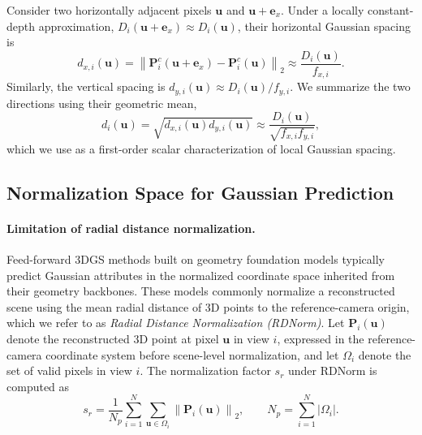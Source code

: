 Consider two horizontally adjacent pixels $\mathbf{u}$ and
$\mathbf{u}+\mathbf{e}_x$. Under a locally constant-depth approximation,
$D_i(\mathbf{u}+\mathbf{e}_x)\approx D_i(\mathbf{u})$, their horizontal
Gaussian spacing is
\begin{equation}
    d_{x,i}(\mathbf{u})
    =
    \left\|
        \mathbf{P}_i^{c}(\mathbf{u}+\mathbf{e}_x)
        -
        \mathbf{P}_i^{c}(\mathbf{u})
    \right\|_2
    \approx
    \frac{D_i(\mathbf{u})}{f_{x,i}}.
    \label{eq:horizontal_gaussian_spacing}
\end{equation}
Similarly, the vertical spacing is
$d_{y,i}(\mathbf{u})\approx D_i(\mathbf{u})/f_{y,i}$.
We summarize the two directions using their geometric mean,
\begin{equation}
    d_i(\mathbf{u})
    =
    \sqrt{
        d_{x,i}(\mathbf{u})d_{y,i}(\mathbf{u})
    }
    \approx
    \frac{D_i(\mathbf{u})}
    {\sqrt{f_{x,i}f_{y,i}}},
    \label{eq:gaussian_spacing}
\end{equation}
which we use as a first-order scalar characterization of local Gaussian
spacing.


\subsection{Normalization Space for Gaussian Prediction}
\label{sec:gsnorm}

\paragraph{Limitation of radial distance normalization.}

Feed-forward 3DGS methods built on geometry foundation models typically
predict Gaussian attributes in the normalized coordinate space inherited
from their geometry backbones. These models commonly normalize a reconstructed scene using the mean radial distance of 3D points to the reference-camera origin, which we
refer to as \emph{Radial Distance Normalization (RDNorm)}.
Let $\mathbf{P}_i(\mathbf{u})$ denote the reconstructed 3D point at
pixel $\mathbf{u}$ in view $i$, expressed in the reference-camera
coordinate system before scene-level normalization, and let $\Omega_i$
denote the set of valid pixels in view $i$.
The normalization factor $s_r$ under RDNorm is computed as
\begin{equation}
    s_r
    =
    \frac{1}{N_p}
    \sum_{i=1}^{N}
    \sum_{\mathbf{u}\in\Omega_i}
    \left\|
        \mathbf{P}_i(\mathbf{u})
    \right\|_2,
    \qquad
    N_p
    =
    \sum_{i=1}^{N}|\Omega_i|.
    \label{eq:radial_distance}
\end{equation}


